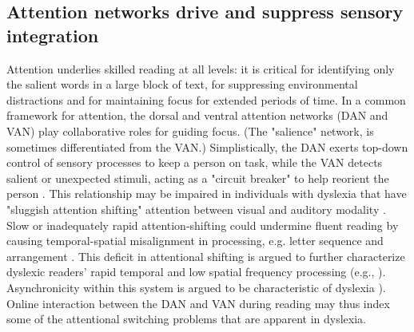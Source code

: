 \subsection{Attention networks drive and suppress sensory integration} 
Attention underlies skilled reading at all levels: it is critical for identifying only the salient words in a large block of text, for suppressing environmental distractions and for maintaining focus for extended periods of time. In a common framework for attention, the dorsal and ventral attention networks (DAN and VAN) play collaborative roles for guiding focus. (The "salience" network, is sometimes differentiated from the VAN.) Simplistically, the DAN exerts top-down control of sensory processes to keep a person on task, while the VAN detects salient or unexpected stimuli, acting as a "circuit breaker" to help reorient the person \citep{Corbetta2002, Vossel2014}. This relationship may be impaired in individuals with dyslexia that have "sluggish attention shifting" attention between visual and auditory modality \citep{Harrar2014}. Slow or inadequately rapid attention-shifting could undermine fluent reading by causing temporal-spatial misalignment in processing, e.g. letter sequence and arrangement \citep{Lallier2009}. This deficit in attentional shifting is argued to further characterize dyslexic readers’ rapid temporal and low spatial frequency processing (e.g., \citep{Ingelhem2001, Witton1998}). Asynchronicity within this system is argued to be characteristic of dyslexia \citep{Vidyasagar2009, Lallier2009, Ingelhem2001}). Online interaction between the DAN and VAN during reading may thus index some of the attentional switching problems that are apparent in dyslexia. 

